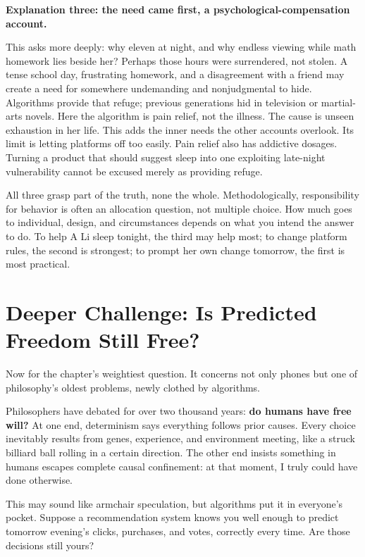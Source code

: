 \textbf{Explanation three: the need came first, a psychological-compensation account.}

This asks more deeply: why eleven at night, and why endless viewing while math homework lies beside her? Perhaps those hours were surrendered, not stolen. A tense school day, frustrating homework, and a disagreement with a friend may create a need for somewhere undemanding and nonjudgmental to hide. Algorithms provide that refuge; previous generations hid in television or martial-arts novels. Here the algorithm is pain relief, not the illness. The cause is unseen exhaustion in her life. This adds the inner needs the other accounts overlook. Its limit is letting platforms off too easily. Pain relief also has addictive dosages. Turning a product that should suggest sleep into one exploiting late-night vulnerability cannot be excused merely as providing refuge.

All three grasp part of the truth, none the whole. Methodologically, responsibility for behavior is often an allocation question, not multiple choice. How much goes to individual, design, and circumstances depends on what you intend the answer to do. To help A Li sleep tonight, the third may help most; to change platform rules, the second is strongest; to prompt her own change tomorrow, the first is most practical.

\section[Is Predicted Freedom Still Free?]{Deeper Challenge: Is Predicted Freedom Still Free?}
Now for the chapter's weightiest question. It concerns not only phones but one of philosophy's oldest problems, newly clothed by algorithms.

Philosophers have debated for over two thousand years: \textbf{do humans have free will?} At one end, determinism says everything follows prior causes. Every choice inevitably results from genes, experience, and environment meeting, like a struck billiard ball rolling in a certain direction. The other end insists something in humans escapes complete causal confinement: at that moment, I truly could have done otherwise.

This may sound like armchair speculation, but algorithms put it in everyone's pocket. Suppose a recommendation system knows you well enough to predict tomorrow evening's clicks, purchases, and votes, correctly every time. Are those decisions still yours?

